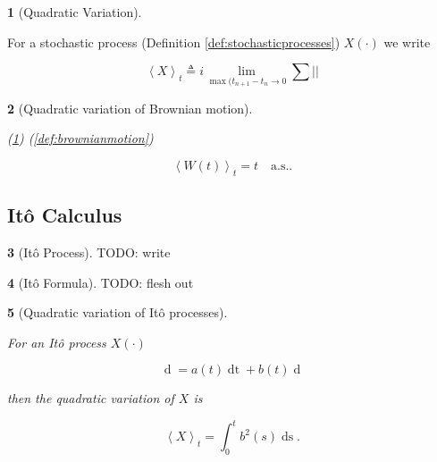 \documentclass[british]{amsart}
\numberwithin{equation}{section}
\numberwithin{figure}{section}
\theoremstyle{plain}
\newtheorem{thm}{\protect\theoremname}[section]
\theoremstyle{definition}
\newtheorem{defn}[thm]{\protect\definitionname}
\theoremstyle{plain}
\theoremstyle{plain}
\theoremstyle{plain}
\theoremstyle{remark}
\theoremstyle{plain}
\providecommand{\definitionname}{Definition}
\providecommand{\theoremname}{Theorem}
\renewcommand{\d}[1]{\mathop{\mathrm{d}{#1}}}
\newcommand{\defeq}{\mathop{\triangleq}}
\newcommand{\almostsurely}{\text{a.s.}}
\begin{document}
\begin{defn} [Quadratic Variation]
	\label{def:quadraticvariation}

	For a stochastic process (Definition \ref{def:stochasticprocesses}) $X(\cdot)$ we write

	\begin{equation*}
		\left< X \right>_{t} \defeq i
			\lim_{\max{(t_{n+1}-t_{n}}\to0}
			\sum \left| \right|
	\end{equation*}

\end{defn}

\begin{thm} [Quadratic variation of Brownian motion]
	\label{thm:quadraticvariationofbrownianmotion}

	(\ref{def:quadraticvariation})
	(\ref{def:brownianmotion})

	\begin{equation}
		\left<W(t)\right>_{t} = t \quad \almostsurely.
	\end{equation}

\end{thm}

\subsection{It\^{o} Calculus}

\begin{defn} [It\^{o} Process]
	\label{def:itoprocess}
	TODO: write
\end{defn}

\begin{defn} [It\^{o} Formula]
	\label{def:itoformula}
	TODO: flesh out
\end{defn}

\begin{thm} [Quadratic variation of It\^{o} processes]
	\label{thm:quadraticvariationofitoprocess}

	For an It\^{o} process $X(\cdot)$ 
	
	\begin{equation*}
		\d{X(t)} = a(t)\d{t} + b(t)\d{W(t)}
	\end{equation*}
	
	then the quadratic variation of $X$ is
	
	\begin{equation*}
		\left< X \right>_{t} = \int_{0}^{t} b^2(s)\d{s}.
	\end{equation*}

\end{thm}
\end{document}
